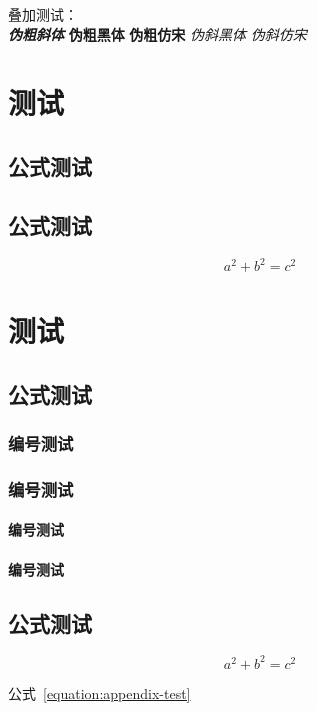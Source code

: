 \documentclass[type = master]{whu-thesis}
\begin{document}
叠加测试：\\
{\bfseries\itshape 伪粗斜体} {\bfseries\sffamily 伪粗黑体} {\bfseries\ttfamily 伪粗仿宋} {\itshape\sffamily 伪斜黑体} {\itshape\ttfamily 伪斜仿宋}


% 


\appendix

\chapter{测试}

\section{公式测试}
\section{公式测试}

\begin{equation}
  a^2 + b^2 = c^2
\end{equation}

\chapter{测试}

\section{公式测试}
\subsection{编号测试}
\subsection{编号测试}
\subsubsection{编号测试}
\subsubsection{编号测试}

\section{公式测试}

\begin{equation}\label{equation:appendix-test}
  a^2 + b^2 = c^2
\end{equation}

公式~\eqref{equation:appendix-test}
\end{document}
